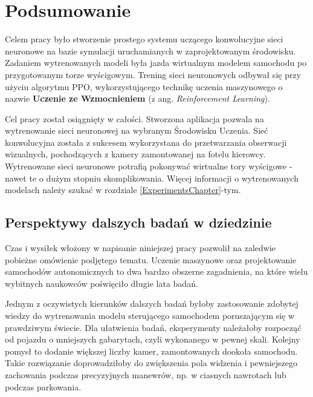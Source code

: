 \chapter*{Podsumowanie}
Celem pracy było stworzenie prostego systemu uczącego konwolucyjne sieci neuronowe na bazie symulacji uruchamianych w zaprojektowanym środowisku. Zadaniem wytrenowanych modeli była jazda wirtualnym modelem samochodu po przygotowanym torze wyścigowym. Trening sieci neuronowych odbywał się przy użyciu algorytmu PPO, wykorzystującego technikę uczenia maszynowego o nazwie \textbf{Uczenie ze Wzmocnieniem} (z ang. \textit{Reinforcement Learning}).

Cel pracy został osiągnięty w całości. Stworzona aplikacja pozwala na wytrenowanie sieci neuronowej na wybranym Środowisku Uczenia. Sieć konwolucyjna została z sukcesem wykorzystana do przetwarzania obserwacji wizualnych, pochodzących z kamery zamontowanej na fotelu kierowcy. Wytrenowane sieci neuronowe potrafią pokonywać wirtualne tory wyścigowe - nawet te o dużym stopniu skomplikowania. Więcej informacji o wytrenowanych modelach należy szukać w rozdziale \ref{ExperimentsChapter}-tym.

\section*{Perspektywy dalszych badań w dziedzinie}
Czas i wysiłek włożony w napisanie niniejszej pracy pozwolił na zaledwie pobieżne omówienie podjętego tematu. Uczenie maszynowe oraz projektowanie samochodów autonomicznych to dwa bardzo obszerne zagadnienia, na które wielu wybitnych naukowców poświęciło długie lata badań.

Jednym z oczywistych kierunków dalszych badań byłoby zastosowanie zdobytej wiedzy do wytrenowania modelu sterującego samochodem poruszającym się w prawdziwym świecie. Dla ułatwienia badań, eksperymenty należałoby rozpocząć od pojazdu o mniejszych gabarytach, czyli wykonanego w pewnej skali. Kolejny pomysł to dodanie większej liczby kamer, zamontowanych dookoła samochodu. Takie rozwiązanie doprowadziłoby do zwiększenia pola widzenia i pewniejszego zachowania podczas precyzyjnych manewrów, np. w ciasnych nawrotach lub podczas parkowania.

\listoffigures